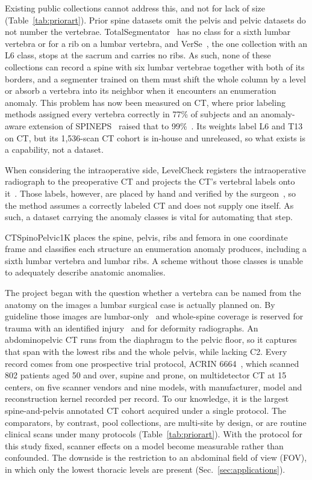 \documentclass[aapm,mph,amsmath,amssymb,preprint,linenumbers]{revtex4-2}
\begin{document}
Existing public collections cannot address this, and not for lack of size
(Table~\ref{tab:priorart}). Prior spine datasets omit the pelvis and pelvic datasets do not number
the vertebrae. TotalSegmentator~\cite{totalsegmentator} has no class for a sixth lumbar vertebra or for a rib on a
lumbar vertebra, and VerSe~\cite{verse2021}, the one collection with an L6 class, stops at the sacrum and
carries no ribs. As such, none of these collections can record a spine with six lumbar vertebrae together with both of its
borders, and a segmenter trained on them must shift the
whole column by a level or absorb a vertebra into its neighbor when it encounters an enumeration anomaly. This problem has now been measured
on CT, where prior labeling methods assigned every vertebra correctly in 77\% of subjects and
an anomaly-aware extension of SPINEPS~\cite{spineps2025} raised that to
99\%~\cite{veridah2026}. Its weights label L6 and T13 on CT, but its 1{,}536-scan CT cohort is in-house and
unreleased, so what exists is a capability, not a dataset. 

When considering the intraoperative side, LevelCheck registers the intraoperative
radiograph to the preoperative CT and projects the CT's vertebral labels onto
it~\cite{otake2012,lo2015,desilva2016}. Those labels, however, are placed by hand and verified by
the surgeon~\cite{otake2012}, so the method assumes a correctly labeled CT and does not supply
one itself. As such, a dataset carrying the anomaly classes is vital for automating that step.

CTSpinoPelvic1K places the spine, pelvis, ribs and femora in one coordinate frame and classifies each structure an enumeration anomaly produces, including a sixth lumbar vertebra and lumbar ribs. A scheme without those classes is unable to adequately describe anatomic anomalies.

The project began with the question whether a vertebra can be named from the anatomy on the images a lumbar surgical case is actually planned on. By guideline those images are lumbar-only~\cite{acr2021,nass2013,acrct2022,acrmri2023} and whole-spine coverage is reserved for trauma with an identified
injury~\cite{sixta2012,tqip2018} and for deformity
radiographs. An abdominopelvic CT runs from the diaphragm to the pelvic floor, so it captures
that span with the lowest ribs and the whole pelvis, while lacking C2. Every record
comes from one prospective trial protocol, ACRIN 6664~\cite{colonog,tcia}, which scanned 802 patients aged 50 and over, supine and prone, on multidetector CT at 15 centers, on five scanner
vendors and nine models, with manufacturer, model and reconstruction kernel recorded per
record. To our knowledge, it is the largest spine-and-pelvis annotated CT cohort acquired under a
single protocol. The comparators, by contrast, pool collections, are multi-site by design, or are
routine clinical scans under many protocols (Table~\ref{tab:priorart}). With the protocol for this study fixed, scanner effects on a model become measurable rather than confounded. The downside is the restriction to an abdominal field of view (FOV), in which only the lowest thoracic levels are present
(Sec.~\ref{sec:applications}).
\end{document}
